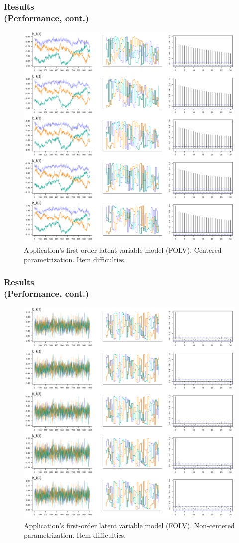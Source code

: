 \documentclass[nonav,sleutel]{beamer}
\begin{document}
	\begin{frame}
		\frametitle{Results \\
			(Performance, cont.)}
		\begin{figure}[H]
			\centering
			\includegraphics[width=0.60\linewidth]{FOLV_CE_bk_1_5}
			\caption{Application’s first-order latent variable model (FOLV). Centered parametrization. Item difficulties.}
			\label{fig:FOLV_CE_chains1}
		\end{figure} 
	\end{frame}
	\begin{frame}
		\frametitle{Results \\
			(Performance, cont.)}
		\begin{figure}[H]
			\centering
			\includegraphics[width=0.60\linewidth]{FOLV_NC_bk_1_5}
			\caption{Application’s first-order latent variable model (FOLV). Non-centered parametrization. Item difficulties.}
			\label{fig:FOLV_NC_chains1}
		\end{figure} 
	\end{frame}
\end{document}
